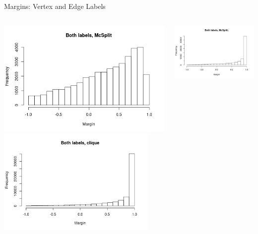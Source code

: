 \documentclass{beamer}
\begin{document}
\begin{frame}{Margins: Vertex and Edge Labels}
  \begin{columns}[t]
    \begin{column}{0.5\textwidth}
      \centering
      \includegraphics[width=\textwidth,height=0.4\textheight,keepaspectratio]{../dissertation/images/both_labels_mcsplit_hist.png}
      \includegraphics[width=0.9\textwidth,height=0.4\textheight,keepaspectratio]{../dissertation/images/both_labels_clique_hist.png}
    \end{column}
    \begin{column}{0.5\textwidth}
      \centering
      \includegraphics[width=\textwidth,height=0.4\textheight,keepaspectratio]{../dissertation/images/both_labels_mcsplitdown_hist.png}

\end{column}
\end{columns}
\end{frame}
\end{document}
